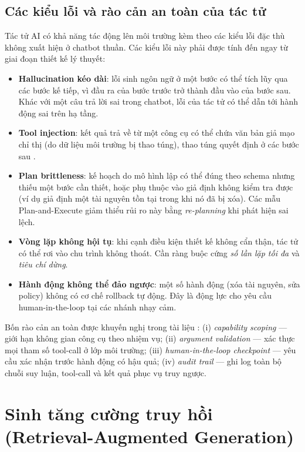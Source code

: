 \subsection{Các kiểu lỗi và rào cản an toàn của tác tử}
\label{subsec:agent-failure-modes}

Tác tử AI có khả năng tác động lên môi trường kèm theo các kiểu lỗi đặc thù không xuất hiện ở chatbot thuần. Các kiểu lỗi này phải được tính đến ngay từ giai đoạn thiết kế lý thuyết:

\begin{itemize}
  \item \textbf{Hallucination kéo dài}: lỗi sinh ngôn ngữ ở một bước có thể tích lũy qua các bước kế tiếp, vì đầu ra của bước trước trở thành đầu vào của bước sau. Khác với một câu trả lời sai trong chatbot, lỗi của tác tử có thể dẫn tới hành động sai trên hạ tầng.
  \item \textbf{Tool injection}: kết quả trả về từ một công cụ có thể chứa văn bản giả mạo chỉ thị (do dữ liệu môi trường bị thao túng), thao túng quyết định ở các bước sau \cite{greshake_prompt_injection_2023}.
  \item \textbf{Plan brittleness}: kế hoạch do mô hình lập có thể đúng theo schema nhưng thiếu một bước cần thiết, hoặc phụ thuộc vào giả định không kiểm tra được (ví dụ giả định một tài nguyên tồn tại trong khi nó đã bị xóa). Các mẫu Plan-and-Execute giảm thiểu rủi ro này bằng \textit{re-planning} khi phát hiện sai lệch.
  \item \textbf{Vòng lặp không hội tụ}: khi cạnh điều kiện thiết kế không cẩn thận, tác tử có thể rơi vào chu trình không thoát. Cần ràng buộc cứng \textit{số lần lặp tối đa} và \textit{tiêu chí dừng}.
  \item \textbf{Hành động không thể đảo ngược}: một số hành động (xóa tài nguyên, sửa policy) không có cơ chế rollback tự động. Đây là động lực cho yêu cầu human-in-the-loop tại các nhánh nhạy cảm.
\end{itemize}

Bốn rào cản an toàn được khuyến nghị trong tài liệu \cite{wang_llm_agent_survey_2024,zaharia_compound_2024}: (i) \textit{capability scoping} --- giới hạn không gian công cụ theo nhiệm vụ; (ii) \textit{argument validation} --- xác thực mọi tham số tool-call ở lớp môi trường; (iii) \textit{human-in-the-loop checkpoint} --- yêu cầu xác nhận trước hành động có hậu quả; (iv) \textit{audit trail} --- ghi log toàn bộ chuỗi suy luận, tool-call và kết quả phục vụ truy ngược.

\section{Sinh tăng cường truy hồi (Retrieval-Augmented Generation)}
\label{sec:rag}

